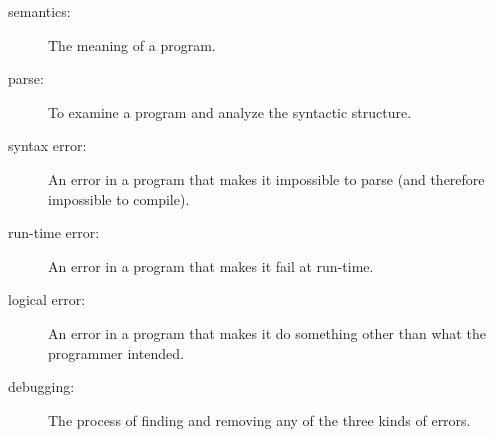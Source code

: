 \begin{description}
\item[semantics:]  The meaning of a program.

\item[parse:]  To examine a program and analyze the syntactic structure.

\item[syntax error:]  An error in a program that makes it impossible
to parse (and therefore impossible to compile).

\item[run-time error:]  An error in a program that makes it fail at
run-time.

\item[logical error:]  An error in a program that makes it do something
other than what the programmer intended.

\item[debugging:]  The process of finding and removing any of
the three kinds of errors.


\end{description}



